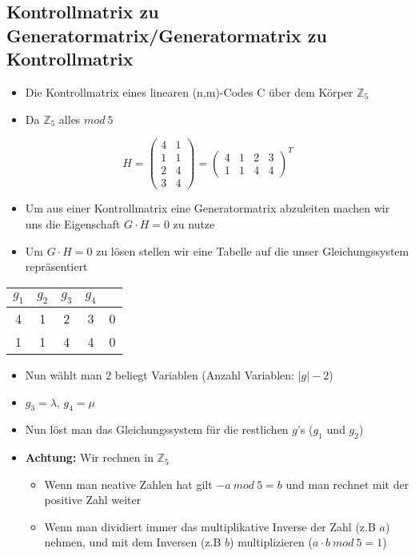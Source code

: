 \subsection{Kontrollmatrix zu Generatormatrix/Generatormatrix zu Kontrollmatrix}

\begin{itemize}
\item Die Kontrollmatrix eines linearen (n,m)-Codes C über dem Körper $\mathbb{Z}_5$
\item Da $\mathbb{Z}_5$ alles $mod \ 5$
\end{itemize}

$$
H = \begin{pmatrix}
4 & 1\\
1 & 1\\
2 & 4\\
3 & 4
\end{pmatrix} = \begin{pmatrix}
4 & 1 & 2 & 3\\
1 & 1 & 4 & 4
\end{pmatrix}^T
$$

\begin{itemize}
\item Um aus einer Kontrollmatrix eine Generatormatrix abzuleiten machen wir uns die Eigenschaft $G\cdot H = 0$ zu nutze
\item Um $G\cdot H = 0$ zu lösen stellen wir eine Tabelle auf die unser Gleichungssystem repräsentiert
\end{itemize}

\begin{table}[h]
\centering
\begin{tabular}{cccc|c}
$g_1$ & $g_2$ & $g_3$ & $g_4$ &\\
\hline
4 & 1 & 2 & 3 & 0\\
1 & 1 & 4 & 4 & 0
\end{tabular}
\end{table}

\begin{itemize}
\item Nun wählt man 2 beliegt Variablen (Anzahl Variablen: $|g| - 2$)
\item $g_3 = \lambda$, $g_4 = \mu$
\item Nun löst man das Gleichungssystem für die restlichen $g$'s ($g_1$ und $g_2$)
\item \textbf{Achtung:} Wir rechnen in $\mathbb{Z}_5$
\begin{itemize}
\item Wenn man neative Zahlen hat gilt $-a \ mod \ 5 = b$ und man rechnet mit der positive Zahl weiter
\item Wenn man dividiert immer das multiplikative Inverse der Zahl (z.B $a$) nehmen, und mit dem Inversen (z.B $b$) multiplizieren ($a \cdot b \ mod  \ 5 = 1$)
\end{itemize}
\end{itemize}

